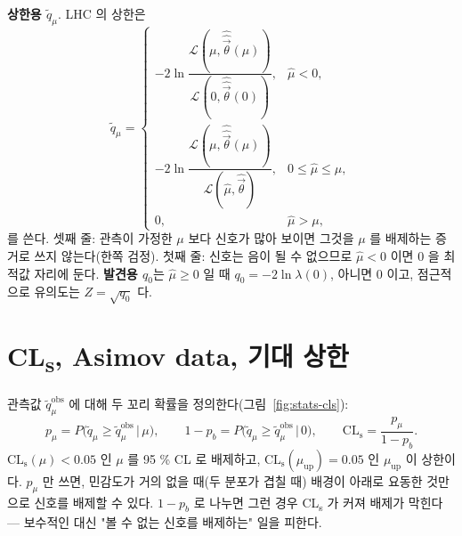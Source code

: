 \textbf{상한용 $\tilde q_\mu$}. LHC 의 상한은
\begin{equation}
  \tilde q_\mu=
  \begin{cases}
    -2\ln\dfrac{\mathcal{L}(\mu,\hat{\hat{\vec\theta}}(\mu))}{\mathcal{L}(0,\hat{\hat{\vec\theta}}(0))}, & \hat\mu<0,\\[2.2ex]
    -2\ln\dfrac{\mathcal{L}(\mu,\hat{\hat{\vec\theta}}(\mu))}{\mathcal{L}(\hat\mu,\hat{\vec\theta})}, & 0\le\hat\mu\le\mu,\\[2.2ex]
    0, & \hat\mu>\mu,
  \end{cases}
  \label{eq:stats-qtilde}
\end{equation}
를 쓴다. 셋째 줄: 관측이 가정한 $\mu$ 보다 신호가 많아 보이면 그것을 $\mu$ 를 배제하는 증거로 쓰지 않는다(한쪽 검정). 첫째 줄: 신호는 음이 될 수 없으므로
$\hat\mu<0$ 이면 $0$ 을 최적값 자리에 둔다. \textbf{발견용 $q_0$}는 $\hat\mu\ge0$ 일 때 $q_0=-2\ln\lambda(0)$, 아니면 0 이고, 점근적으로 유의도는
$Z=\sqrt{q_0}$ 다.

\section{CL\textsubscript{s}, Asimov data, 기대 상한}\label{sec:stats-cls}

관측값 $\tilde q_\mu^{\mathrm{obs}}$ 에 대해 두 꼬리 확률을 정의한다(그림~\ref{fig:stats-cls}):
\begin{equation}
  p_\mu=P\bigl(\tilde q_\mu\ge\tilde q_\mu^{\mathrm{obs}}\,\big|\,\mu\bigr),\qquad
  1-p_b=P\bigl(\tilde q_\mu\ge\tilde q_\mu^{\mathrm{obs}}\,\big|\,0\bigr),\qquad
  \mathrm{CL_s}=\frac{p_\mu}{1-p_b}.
  \label{eq:stats-cls}
\end{equation}
$\mathrm{CL_s}(\mu)<0.05$ 인 $\mu$ 를 95 \% CL 로 배제하고, $\mathrm{CL_s}(\mu_{\mathrm{up}})=0.05$ 인 $\mu_{\mathrm{up}}$ 이 상한이다. $p_\mu$ 만 쓰면, 민감도가 거의
없을 때(두 분포가 겹칠 때) 배경이 아래로 요동한 것만으로 신호를 배제할 수 있다. $1-p_b$ 로 나누면 그런 경우 CL\textsubscript{s} 가 커져 배제가 막힌다 —
보수적인 대신 "볼 수 없는 신호를 배제하는" 일을 피한다.

